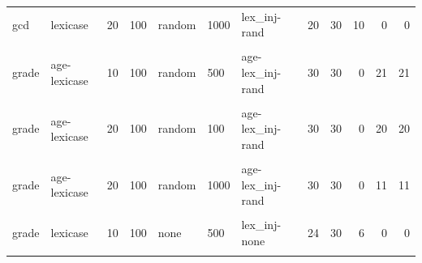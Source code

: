 \documentclass[
]{book}
\begin{document}
\begin{table}
\begin{tabular}{l|l|l|l|l|l|l|r|r|r|r|r}
\hline
\cellcolor{gray!6}{gcd} & \cellcolor{gray!6}{lexicase} & \cellcolor{gray!6}{20} & \cellcolor{gray!6}{100} & \cellcolor{gray!6}{random} & \cellcolor{gray!6}{500} & \cellcolor{gray!6}{lex\_inj-rand} & \cellcolor{gray!6}{17} & \cellcolor{gray!6}{30} & \cellcolor{gray!6}{13} & \cellcolor{gray!6}{0} & \cellcolor{gray!6}{0}\\
\hline
gcd & lexicase & 20 & 100 & random & 1000 & lex\_inj-rand & 20 & 30 & 10 & 0 & 0\\
\hline
\cellcolor{gray!6}{grade} & \cellcolor{gray!6}{age-lexicase} & \cellcolor{gray!6}{10} & \cellcolor{gray!6}{100} & \cellcolor{gray!6}{random} & \cellcolor{gray!6}{100} & \cellcolor{gray!6}{age-lex\_inj-rand} & \cellcolor{gray!6}{30} & \cellcolor{gray!6}{30} & \cellcolor{gray!6}{0} & \cellcolor{gray!6}{21} & \cellcolor{gray!6}{21}\\
\hline
grade & age-lexicase & 10 & 100 & random & 500 & age-lex\_inj-rand & 30 & 30 & 0 & 21 & 21\\
\hline
\cellcolor{gray!6}{grade} & \cellcolor{gray!6}{age-lexicase} & \cellcolor{gray!6}{10} & \cellcolor{gray!6}{100} & \cellcolor{gray!6}{random} & \cellcolor{gray!6}{1000} & \cellcolor{gray!6}{age-lex\_inj-rand} & \cellcolor{gray!6}{30} & \cellcolor{gray!6}{30} & \cellcolor{gray!6}{0} & \cellcolor{gray!6}{16} & \cellcolor{gray!6}{16}\\
\hline
grade & age-lexicase & 20 & 100 & random & 100 & age-lex\_inj-rand & 30 & 30 & 0 & 20 & 20\\
\hline
\cellcolor{gray!6}{grade} & \cellcolor{gray!6}{age-lexicase} & \cellcolor{gray!6}{20} & \cellcolor{gray!6}{100} & \cellcolor{gray!6}{random} & \cellcolor{gray!6}{500} & \cellcolor{gray!6}{age-lex\_inj-rand} & \cellcolor{gray!6}{30} & \cellcolor{gray!6}{30} & \cellcolor{gray!6}{0} & \cellcolor{gray!6}{12} & \cellcolor{gray!6}{12}\\
\hline
grade & age-lexicase & 20 & 100 & random & 1000 & age-lex\_inj-rand & 30 & 30 & 0 & 11 & 11\\
\hline
\cellcolor{gray!6}{grade} & \cellcolor{gray!6}{lexicase} & \cellcolor{gray!6}{10} & \cellcolor{gray!6}{100} & \cellcolor{gray!6}{none} & \cellcolor{gray!6}{100} & \cellcolor{gray!6}{lex\_inj-none} & \cellcolor{gray!6}{20} & \cellcolor{gray!6}{30} & \cellcolor{gray!6}{10} & \cellcolor{gray!6}{0} & \cellcolor{gray!6}{0}\\
\hline
grade & lexicase & 10 & 100 & none & 500 & lex\_inj-none & 24 & 30 & 6 & 0 & 0\\
\hline
\cellcolor{gray!6}{grade} & \cellcolor{gray!6}{lexicase} & \cellcolor{gray!6}{10} & \cellcolor{gray!6}{100} & \cellcolor{gray!6}{none} & \cellcolor{gray!6}{1000} & \cellcolor{gray!6}{lex\_inj-none} & \cellcolor{gray!6}{23} & \cellcolor{gray!6}{30} & \cellcolor{gray!6}{7} & \cellcolor{gray!6}{0} & \cellcolor{gray!6}{0}\\

\end{tabular}
\end{table}
\end{document}
